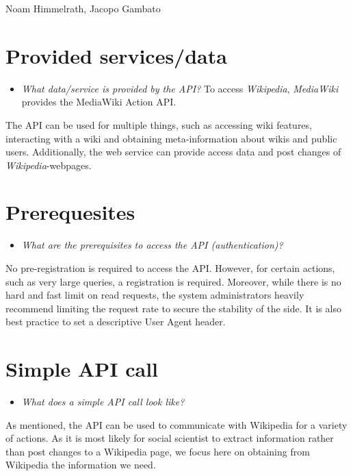 \documentclass[
]{book}
\providecommand{\tightlist}{%
  \setlength{\itemsep}{0pt}\setlength{\parskip}{0pt}}
\begin{document}
Noam Himmelrath, Jacopo Gambato

\hypertarget{provided-servicesdata-10}{%
\section{Provided services/data}\label{provided-servicesdata-10}}

\begin{itemize}
\tightlist
\item
  \emph{What data/service is provided by the API?}
  To access \emph{Wikipedia}, \emph{MediaWiki} provides the MediaWiki Action API.
\end{itemize}

The API can be used for multiple things, such as accessing wiki features, interacting with a wiki and obtaining meta-information about wikis and public users. Additionally, the web service can provide access data and post changes of \emph{Wikipedia}-webpages.

\hypertarget{prerequesites-10}{%
\section{Prerequesites}\label{prerequesites-10}}

\begin{itemize}
\tightlist
\item
  \emph{What are the prerequisites to access the API (authentication)? }
\end{itemize}

No pre-registration is required to access the API. However, for certain actions, such as very large queries, a registration is required. Moreover, while there is no hard and fast limit on read requests, the system administrators heavily recommend limiting the request rate to secure the stability of the side. It is also best practice to set a descriptive User Agent header.

\hypertarget{simple-api-call-10}{%
\section{Simple API call}\label{simple-api-call-10}}

\begin{itemize}
\tightlist
\item
  \emph{What does a simple API call look like?}
\end{itemize}

As mentioned, the API can be used to communicate with Wikipedia for a variety of actions. As it is most likely for social scientist to extract information rather than post changes to a Wikipedia page, we focus here on obtaining from Wikipedia the information we need.
\end{document}

